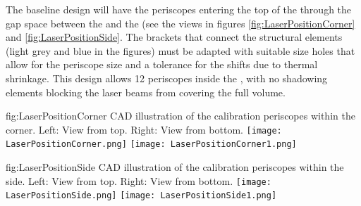 The baseline design will have the periscopes entering the top of the  through the gap space between the  and the  (see the views in figures \ref{fig:LaserPositionCorner} and \ref{fig:LaserPositionSide}. The brackets that connect the  structural elements (light grey and blue in the figures) must be adapted with suitable size holes that allow for the periscope size and a tolerance for the shifts due to  thermal shrinkage. This design allows \num{12} periscopes inside the , with no shadowing elements blocking the laser beams from covering the full volume.

\begin{dunefigure}{fig:LaserPositionCorner}
{CAD illustration of the calibration periscopes within the    corner. Left: View from top. Right: View from bottom.}
\texttt{[image: LaserPositionCorner.png]}
\texttt{[image: LaserPositionCorner1.png]}
\end{dunefigure}

\begin{dunefigure}{fig:LaserPositionSide}
{CAD illustration of the calibration periscopes within the    side. 
Left: View from top. Right: View from bottom.}
\texttt{[image: LaserPositionSide.png]}
\texttt{[image: LaserPositionSide1.png]}
\end{dunefigure}





